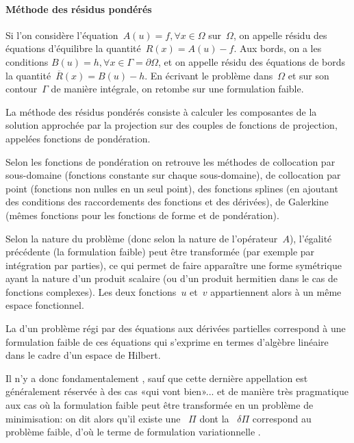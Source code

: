 \medskip
\paragraph{Méthode des résidus pondérés}\label{Sec-ResPond}
Si l'on considère l'équation~$A(u)=f, \forall x\in\Omega$ sur~$\Omega$, on appelle résidu des équations d'équilibre la quantité~$R(x)=A(u)-f$. Aux bords, on a les conditions $B(u)=h, \forall x\in\Gamma=\partial\Omega$, et on appelle résidu des équations de bords la quantité~$\overline{R}(x)=B(u)-h$. En écrivant le problème dans~$\Omega$ et sur son contour~$\Gamma$ de manière intégrale, on retombe sur une formulation faible.

La méthode des résidus pondérés consiste à calculer les composantes de la solution approchée par la projection sur des couples de fonctions de projection, appelées fonctions de pondération.

Selon les fonctions de pondération on retrouve les méthodes de collocation par sous-domaine (fonctions constante sur chaque sous-domaine), de collocation par point (fonctions non nulles en un seul point), des fonctions splines (en ajoutant des conditions des raccordements des fonctions et des dérivées), de Galerkine (mêmes fonctions pour les fonctions de forme et de pondération).

\medskip
Selon la nature du problème (donc selon la nature de l'opérateur~$A$), l'égalité précédente (la formulation faible) peut être transformée (par exemple par intégration par parties), ce qui permet de faire apparaître une forme symétrique ayant la nature d'un produit scalaire (ou d'un produit hermitien dans le cas de fonctions complexes). Les deux fonctions~$u$ et~$v$ appartiennent alors à un même espace fonctionnel.

\medskip
La  d'un problème régi par des équations aux dérivées partielles correspond à une formulation faible de ces équations qui s'exprime en termes d'algèbre linéaire dans le cadre d'un espace de Hilbert.

Il n'y a donc fondamentalement , sauf que cette dernière appellation est généralement réservée à des cas «qui vont bien»... et de manière très pragmatique aux cas où la formulation faible peut être transformée en un problème de minimisation: on dit alors qu'il existe une ~$\Pi$ dont la ~$\delta\Pi$ correspond au problème faible, d'où le terme de formulation variationnelle .

